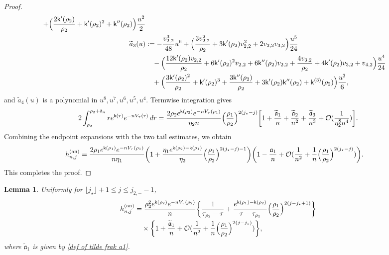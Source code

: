 \documentclass[a4paper]{article}
\newtheorem{lemma}[theorem]{Lemma}
\numberwithin{equation}{section}
\begin{document}
\begin{proof}
\begin{align*}
 +\Bigl(\frac{2\mathsf{k}'(\rho_2)}{\rho_2}+\mathsf{k}'(\rho_2)^2+\mathsf{k}''(\rho_2)\Bigr)\frac{u^2}{2}
 \\
 \widetilde{a}_{3}(u)&:=-\frac{v_{2,2}^3}{48}u^6+\Bigl(\frac{3v_{2,2}^2}{\rho_2}+3\mathsf{k}'(\rho_2)v_{2,2}^2+2v_{2,2}v_{3,2}\Bigr)\frac{u^5}{24}
 \\
 &\quad -\Bigl(\frac{12\mathsf{k}'(\rho_2)v_{2,2}}{\rho_2}+6\mathsf{k}'(\rho_2)^2v_{2,2}+6\mathsf{k}''(\rho_2)v_{2,2}+\frac{4v_{3,2}}{\rho_2}+4\mathsf{k}'(\rho_2)v_{3,2}+v_{4,2}\Bigr)\frac{u^4}{24}
 \\
 &\quad
 +\Bigl(\frac{3\mathsf{k}'(\rho_2)^2}{\rho_2}+\mathsf{k}'(\rho_2)^3+\frac{3\mathsf{k}''(\rho_2)}{\rho_2}+3\mathsf{k}'(\rho_2)\mathsf{k}''(\rho_2)+\mathsf{k}^{(3)}(\rho_2)\Bigr)\frac{u^3}{6}, 
\end{align*}
and $\widetilde a_4(u)$ is a polynomial in $u^8,u^7,u^6,u^5,u^4$. Termwise integration gives
\[
2\int_{\rho_2}^{\rho_2+\delta_n}re^{\mathsf{k}(r)}e^{-nV_{\tau}(r)}\,dr
=
\frac{2\rho_2e^{\mathsf{k}(\rho_2)}e^{-nV_{\tau}(\rho_1)}}{\eta_2n}
\Bigl(\frac{\rho_1}{\rho_2}\Bigr)^{2(j_{\star}-j)}
\bigg[
1+\frac{\widetilde{\mathfrak{a}}_1}{n}+\frac{\widetilde{\mathfrak{a}}_2}{n^2}+\frac{\widetilde{\mathfrak{a}}_3}{n^3}+\mathcal{O}(\frac{1}{\eta_2^8n^4})
\bigg].
\]
Combining the endpoint expansions with the two tail estimates, we obtain
\begin{align*}
h_{n,j}^{(\mathrm{an})}&=
\frac{2\rho_1e^{\mathsf{k}(\rho_1)}e^{-nV_{\tau}(\rho_1)}}{n\eta_1}
\bigg(
1+\frac{\eta_1e^{\mathsf{k}(\rho_2)-\mathsf{k}(\rho_1)}}{\eta_2}\Bigl( \frac{\rho_1}{\rho_2}\Bigr)^{2(j_{\star}-j)-1}
\bigg)
\bigg(
1-\frac{\mathfrak{a}_1}{n}+\mathcal{O}(\frac{1}{n^2}+\frac{1}{n}\Bigl( \frac{\rho_1}{\rho_2}\Bigr)^{2(j_{\star}-j)})
\bigg).
\end{align*}
This completes the proof. 
\end{proof}

\begin{lemma}\label{lemma: jstar leq j leq j2-}
Uniformly for $\lfloor j_{\star}\rfloor+1\leq j\leq j_{2,-}-1$,
\begin{align}
\begin{split}
h_{n,j}^{(\mathrm{an})}&= 
 \frac{\rho_2^2e^{\mathsf{k}(\rho_2)}e^{-nV_{\tau}(\rho_2)}}{n}
\bigg\{
\frac{1}{\tau_{\rho_2}-\tau}+\frac{e^{\mathsf{k}(\rho_1)-\mathsf{k}(\rho_2)}}{\tau-\tau_{\rho_1}}\Bigl( \frac{\rho_1}{\rho_2}\Bigr)^{2(j-j_{\star}+1)}
\bigg\}
\\
&\quad
\times\bigg\{
1+\frac{\widetilde{\mathfrak{a}}_1}{n}+\mathcal{O}(\frac{1}{n^2}+\frac{1}{n}\Bigl( \frac{\rho_1}{\rho_2}\Bigr)^{2(j-j_{\star})})
\bigg\},
\end{split}
\end{align}
where $\widetilde{\mathfrak a}_1$ is given by \eqref{def of tilde frak a1}.
\end{lemma}
\end{document}
